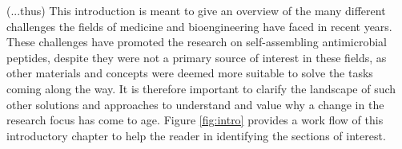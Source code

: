 

\vspace{1cm}
(...thus) This introduction is meant to give an overview of the many different challenges the fields of medicine and bioengineering have faced in recent years. These challenges have promoted the research on self-assembling antimicrobial peptides, despite they were not a primary source of interest in these fields, as other materials and concepts were deemed more suitable to solve the tasks coming along the way. It is therefore important to clarify the landscape of such other solutions and approaches to understand and value why a change in the research focus has come to age. Figure \ref{fig:intro} provides a work flow of this introductory chapter to help the reader in identifying the sections of interest.

